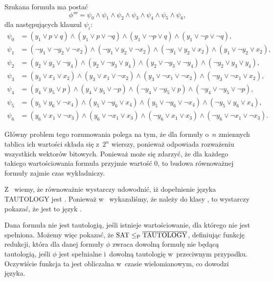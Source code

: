 \exercise %


\exercise %

\exercise %
Szukana formuła  ma postać
\[
	\phi''' = \psi_0\wedge\psi_1\wedge\psi_2\wedge\psi_3\wedge\psi_4\wedge\psi_5\wedge\psi_6,
\]
dla następujących klauzul $\psi_i$:
\begin{align*}
	\psi_0 &= (y_1\vee p\vee q)\wedge(y_1\vee p\vee\neg q)\wedge(y_1\vee\neg p\vee q)\wedge(y_1\vee\neg p\vee\neg q), \\
	\psi_1 &= (\neg y_1\vee\neg y_2\vee\neg x_2)\wedge(\neg y_1\vee y_2\vee\neg x_2)\wedge(\neg y_1\vee y_2\vee x_2)\wedge(y_1 \vee\neg y_2\vee x_2), \\
	\psi_2 &= (y_2\vee y_3\vee\neg y_4)\wedge(y_2\vee\neg y_3\vee y_4)\wedge(y_2\vee\neg y_3\vee\neg y_4)\wedge(\neg y_2\vee y_3\vee y_4), \\
	\psi_3 &= (y_3\vee x_1\vee x_2)\wedge(y_3\vee x_1\vee\neg x_2)\wedge(y_3\vee\neg x_1\vee\neg x_2)\wedge(\neg y_3\vee\neg x_1\vee x_2), \\
	\psi_4 &= (y_4\vee y_5\vee p)\wedge(y_4\vee y_5\vee\neg p)\wedge(\neg y_4\vee\neg y_5\vee p)\wedge(\neg y_4\vee\neg y_5\vee\neg p), \\
	\psi_5 &= (y_5\vee y_6\vee\neg x_4)\wedge(y_5\vee\neg y_6\vee x_4)\wedge(y_5\vee\neg y_6\vee\neg x_4)\wedge(\neg y_5\vee y_6\vee x_4), \\
	\psi_6 &= (y_6\vee x_1\vee\neg x_3)\wedge(y_6\vee\neg x_1\vee x_3)\wedge(\neg y_6\vee x_1\vee x_3)\wedge(\neg y_6\vee\neg x_1\vee\neg x_3).
\end{align*}

\exercise %
Główny problem tego rozumowania polega na tym, że dla formuły o~$n$ zmiennych tablica ich wartości składa się z~$2^n$ wierszy, ponieważ odpowiada rozważeniu wszystkich  wektorów bitowych.
Ponieważ może się zdarzyć, że dla każdego takiego wartościowania formuła przyjmie wartość 0, to budowa równoważnej formuły  zajmie czas wykładniczy.

\exercise %
Z~ wiemy, że równoważnie wystarczy udowodnić, iż dopełnienie języka TAUTOLOGY jest .
Ponieważ w~ wykazaliśmy, że należy do klasy \NPclass, to wystarczy pokazać, że jest to język .

Dana formuła nie jest tautologią, jeśli istnieje wartościowanie, dla którego nie jest spełniona.
Możemy więc pokazać, że $\text{SAT}\le_{\text{P}}\overline{\text{TAUTOLOGY}}$, definiując funkcję redukcji, która dla danej formuły $\phi$ zwraca dowolną formułę nie będącą tautologią, jeśli $\phi$ jest spełnialne i~dowolną tautologię w~przeciwnym przypadku.
Oczywiście funkcja ta jest obliczalna w~czasie wielomianowym, co dowodzi  języka.


